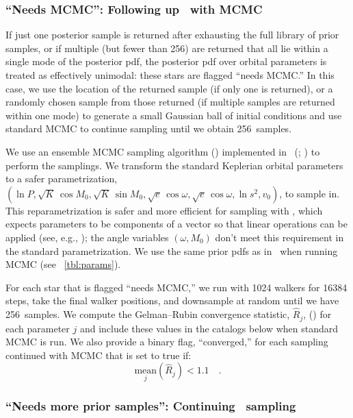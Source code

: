 \documentclass[modern, letterpaper]{aastex62}
\newcommand{\thejoker}{\project{The~Joker}}
\newcommand{\nposterior}{256}
\begin{document}
\subsubsection{``Needs MCMC'': Following up \thejoker\ with MCMC}
\label{sec:mcmc}

If just one posterior sample is returned after exhausting the full library of
prior samples, or if multiple (but fewer than \nposterior) are returned that all
lie within a single mode of the posterior pdf, the posterior pdf over orbital
parameters is treated as effectively unimodal: these stars are flagged ``needs
MCMC.''
In this case, we use the location of the returned sample (if only one is
returned), or a randomly chosen sample from those returned (if multiple samples
are returned within one mode) to generate a small Gaussian ball of initial
conditions and use standard MCMC to continue sampling until we obtain
\nposterior\ samples.

We use an ensemble MCMC sampling algorithm (\citealt{Goodman:2010}) implemented
in \python\ (; \citealt{Foreman-Mackey:2013}) to perform the
samplings.
We transform the standard Keplerian orbital parameters to a safer
parametrization, $(\ln P, \sqrt{K}\,\cos M_0, \sqrt{K}\,\sin M_0, \sqrt{e}\,\cos
\omega, \sqrt{e}\,\cos \omega, \ln s^2, v_0)$, to sample in.
This reparametrization is safer and more efficient for sampling with
, which expects parameters to be components of a vector so that
linear operations can be applied (see, e.g., \citealt{Hogg:2017}); the angle
variables $(\omega, M_0)$ don't meet this requirement in the standard
parametrization.
We use the same prior pdfs as in \thejoker\ when running MCMC (see
\tablename~\ref{tbl:params}).

For each star that is flagged ``needs MCMC,'' we run  with 1024
walkers for 16384 steps, take the final walker positions, and downsample at
random until we have \nposterior\ samples.
We compute the Gelman--Rubin convergence statistic, $\hat{R}_j$,
(\citealt{Gelman:1992}) for each parameter $j$ and include these values in the
catalogs below when standard MCMC is run.
We also provide a binary flag, ``converged,'' for each sampling continued with
MCMC that is set to true if:
\begin{equation}
\underset{j}{\textrm{mean}}\left(\hat{R}_j\right) < 1.1 \quad .
\end{equation}


\subsubsection{``Needs more prior samples'': Continuing \thejoker\ sampling}
\end{document}
